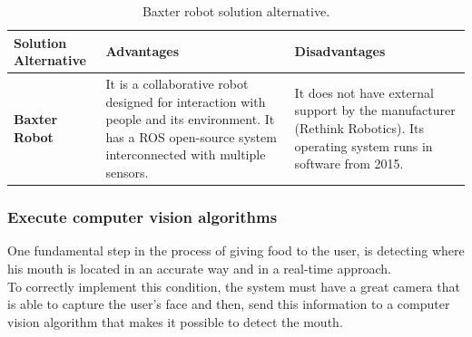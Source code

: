 \documentclass[11pt]{report} %
\begin{document}
\begin{table}[H]
\begin{center}
    \begin{tabular}{M{6.6cm}M{3.3cm}M{3.3cm}}
    \hline
    \textbf{Solution Alternative} & \textbf{Advantages} & \textbf{Disadvantages} \\ 
    \hline
    
    \textbf{Baxter Robot}

    
    \citep{cite_rethink_robotics_baxter_factory_worker}

    &

    It is a collaborative robot designed for interaction with people and its environment. It has a ROS open-source system interconnected with multiple sensors.

    &

    It does not have external support by the manufacturer (Rethink Robotics). Its operating system runs in  software from 2015.

    \\ \hline
    \end{tabular}
\caption{\label{tab:baxter} Baxter robot solution alternative.}
\end{center}
\end{table}

\subsubsection{Execute computer vision algorithms}

One fundamental step in the process of giving food to the user, is detecting where his mouth is located in an accurate way and in a real-time approach.\\

To correctly implement this condition, the system must have a great camera that is able to capture the user's face and then, send this information to a computer vision algorithm that makes it possible to detect the mouth.\\
\end{document}
